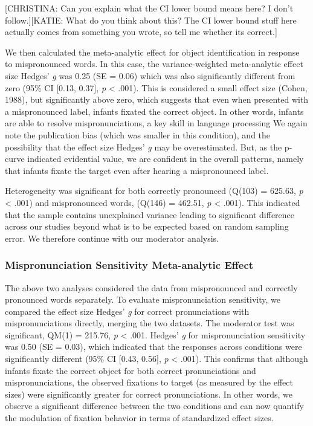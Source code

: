\documentclass[man]{apa6}
\theoremstyle{definition}
\theoremstyle{definition}
\theoremstyle{definition}
\theoremstyle{remark}
\begin{document}
{[}CHRISTINA: Can you explain what the CI lower bound means here? I
don't follow.{]}{[}KATIE: What do you think about this? The CI lower
bound stuff here actually comes from something you wrote, so tell me
whether its correct.{]}

We then calculated the meta-analytic effect for object identification in
response to mispronounced words. In this case, the variance-weighted
meta-analytic effect size Hedges' \emph{g} was 0.25 (SE = 0.06) which
was also significantly different from zero (95\% CI {[}0.13, 0.37{]},
\emph{p} \textless{} .001). This is considered a small effect size
(Cohen, 1988), but significantly above zero, which suggests that even
when presented with a mispronounced label, infants fixated the correct
object. In other words, infants are able to resolve mispronunciations, a
key skill in language processing We again note the publication bias
(which was smaller in this condition), and the possibility that the
effect size Hedges' \emph{g} may be overestimated. But, as the p-curve
indicated evidential value, we are confident in the overall patterns,
namely that infants fixate the target even after hearing a mispronounced
label.

Heterogeneity was significant for both correctly pronounced (Q(103) =
625.63, \emph{p} \textless{} .001) and mispronounced words, (Q(146) =
462.51, \emph{p} \textless{} .001). This indicated that the sample
contains unexplained variance leading to significant difference across
our studies beyond what is to be expected based on random sampling
error. We therefore continue with our moderator analysis.

\subsubsection{Mispronunciation Sensitivity Meta-analytic
Effect}\label{mispronunciation-sensitivity-meta-analytic-effect}

The above two analyses considered the data from mispronounced and
correctly pronounced words separately. To evaluate mispronunciation
sensitivity, we compared the effect size Hedges' \emph{g} for correct
pronunciations with mispronunciations directly, merging the two
datasets. The moderator test was significant, QM(1) = 215.76, \emph{p}
\textless{} .001. Hedges' \emph{g} for mispronunciation sensitivity was
0.50 (SE = 0.03), which indicated that the responses across conditions
were significantly different (95\% CI {[}0.43, 0.56{]}, \emph{p}
\textless{} .001). This confirms that although infants fixate the
correct object for both correct pronunciations and mispronunciations,
the observed fixations to target (as measured by the effect sizes) were
significantly greater for correct pronunciations. In other words, we
observe a significant difference between the two conditions and can now
quantify the modulation of fixation behavior in terms of standardized
effect sizes.
\end{document}
